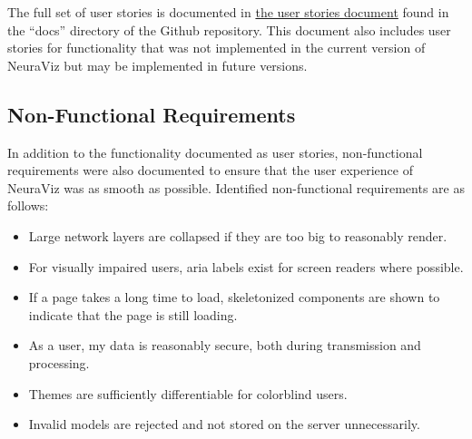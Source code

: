 The full set of user stories is documented in \href{https://github.com/Bennett-Wendorf/NeuraViz/blob/main/docs/user_stories.md}{the user stories document} found in the ``docs'' directory of the Github repository. This document also includes user stories for functionality that was not implemented in the current version of NeuraViz but may be implemented in future versions.

\subsection{Non-Functional Requirements}
In addition to the functionality documented as user stories, non-functional requirements were also documented to ensure that the user experience of NeuraViz was as smooth as possible. Identified non-functional requirements are as follows:
\begin{itemize}
    \item Large network layers are collapsed if they are too big to reasonably render.
    \item For visually impaired users, aria labels exist for screen readers where possible.
    \item If a page takes a long time to load, skeletonized components are shown to indicate that the page is still loading.
    \item As a user, my data is reasonably secure, both during transmission and processing.
    \item Themes are sufficiently differentiable for colorblind users.
    \item Invalid models are rejected and not stored on the server unnecessarily.
\end{itemize}
